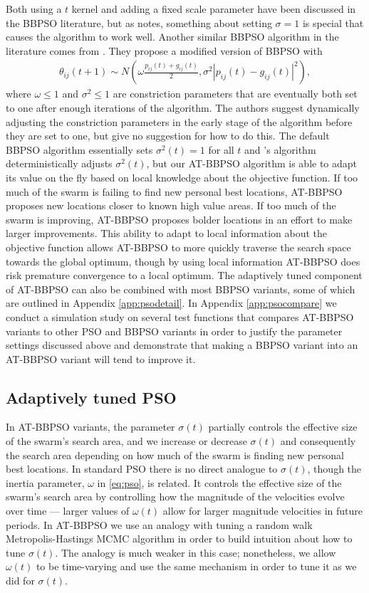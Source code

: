 \documentclass[12pt]{article}
\begin{document}
Both using a $t$ kernel and adding a fixed scale parameter have been discussed in the BBPSO literature, but as \citet{kennedy2003bare} notes, something about setting $\sigma=1$ is special that causes the algorithm to work well. Another similar BBPSO algorithm in the literature comes from \citet{hsieh2010modified}. They propose a modified version of BBPSO with 
\begin{align*}
\theta_{ij}(t+1) \sim N\left(\omega\frac{p_{ij}(t) + g_{ij}(t)}{2}, \sigma^2|p_{ij}(t) - g_{ij}(t)|^2\right),
\end{align*}
where $\omega\leq 1$ and $\sigma^2\leq 1$ are constriction parameters that are eventually both set to one after enough iterations of the algorithm. The authors suggest dynamically adjusting the constriction parameters in the early stage of the algorithm before they are set to one, but give no suggestion for how to do this. The default BBPSO algorithm essentially sets $\sigma^2(t)=1$ for all $t$ and \citet{hsieh2010modified}'s algorithm deterministically adjusts $\sigma^2(t)$, but our AT-BBPSO algorithm is able to adapt its value on the fly based on local knowledge about the objective function. If too much of the swarm is failing to find new personal best locations, AT-BBPSO proposes new locations closer to known high value areas. If too much of the swarm is improving, AT-BBPSO proposes bolder locations in an effort to make larger improvements. This ability to adapt to local information about the objective function allows AT-BBPSO to more quickly traverse the search space towards the global optimum, though by using local information AT-BBPSO does risk premature convergence to a local optimum. The adaptively tuned component of AT-BBPSO can also be combined with most BBPSO variants, some of which are outlined in Appendix \ref{app:psodetail}. In Appendix \ref{app:psocompare} we conduct a simulation study on several test functions that compares AT-BBPSO variants to other PSO and BBPSO variants in order to justify the parameter settings discussed above and demonstrate that making a BBPSO variant into an AT-BBPSO variant will tend to improve it.

\subsection{Adaptively tuned PSO}\label{sec:AT-PSO}
In AT-BBPSO variants, the parameter $\sigma(t)$ partially controls the effective size of the swarm's search area, and we increase or decrease $\sigma(t)$ and consequently the search area depending on how much of the swarm is finding new personal best locations. In standard PSO there is no direct analogue to $\sigma(t)$, though the inertia parameter, $\omega$ in \eqref{eq:pso}, is related. It controls the effective size of the swarm's search area by controlling how the magnitude of the velocities evolve over time --- larger values of $\omega(t)$ allow for larger magnitude velocities in future periods. In AT-BBPSO we use an analogy with tuning a random walk Metropolis-Hastings MCMC algorithm in order to build intuition about how to tune $\sigma(t)$. The analogy is much weaker in this case; nonetheless, we allow $\omega(t)$ to be time-varying and use the same mechanism in order to tune it as we did for $\sigma(t)$.
\end{document}
